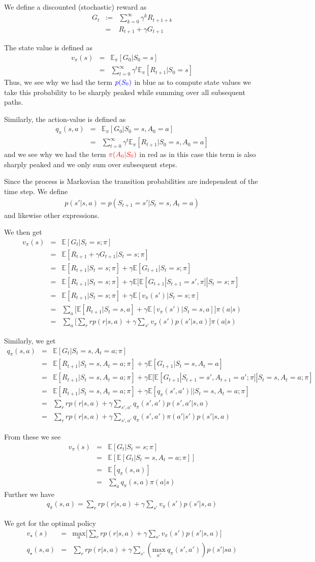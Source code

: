 \documentclass[11pt,a4paper]{article}
\newcommand\bea{\begin{eqnarray}}
\newcommand\eea{\end{eqnarray}}
\newcommand{\nn}{\nonumber \\}
\newcommand{\e}[1]{\mathbb E[#1]}
\begin{document}
We define a discounted (stochastic) reward as
\bea
G_t &:=& \sum_{k=0}^\infty \gamma^k R_{t+1+k} \nn
&=& R_{t+1} + \gamma G_{t+1}
\eea

The state value is defined as
\bea
v_\pi(s) &=& \mathbb E_\pi[G_0|S_0=s] \nn
&=& \sum_{t=0}^\infty \gamma^t \mathbb E_\pi[R_{t+1} |S_0=s]
\eea
Thus, we see why we had the term $\color{blue}{p(S_0)}$ in blue as to compute state values we take this probability to be sharply peaked while summing over all subsequent paths.

Similarly, the action-value is defined as 
\bea
q_\pi(s,a) &=& \mathbb E_\pi[G_0|S_0=s,A_0=a] \nn
&=& \sum_{t=0}^\infty \gamma^t \mathbb E_\pi[R_{t+1} |S_0=s,A_0=a]
\eea
and we see why we had the term $\color{red}{\pi(A_0|S_0)}$ in red as in this case this term is also sharply peaked and we only sum over subsequent steps. 

Since the process is Markovian the transition probabilities are independent of the time step. We define
\bea
p(s'|s,a) = p(S_{t+1}=s'|S_t=s,A_t=a)
\eea
and likewise other expressions.

We then get
\bea
v_\pi(s) &=& \e{G_t|S_t=s;\pi} \nn
&=& \e{R_{t+1} + \gamma G_{t+1} |S_t=s;\pi} \nn
&=& \e{R_{t+1}|S_t=s;\pi} + \gamma \e{G_{t+1}|S_t=s;\pi} \nn
&=& \e{R_{t+1}|S_t=s;\pi} + \gamma \e{\e{G_{t+1}|S_{t+1}=s',\pi}|S_t=s;\pi}  \nn
&=& \e{R_{t+1}|S_t=s;\pi} + \gamma \e{v_\pi(s') |S_t=s;\pi} \nn
&=& \sum_a \Bigg[\e{R_{t+1}|S_t=s,a} + \gamma \e{v_\pi(s') |S_t=s,a} \Bigg] \pi(a|s) \nn
&=& \sum_a \Bigg[\sum_r r p(r|s,a) + \gamma \sum_{s'} v_\pi(s') p(s'|s,a) \Bigg] \pi(a|s) 
\eea

Similarly, we get
\bea
q_\pi(s,a) &=& \e{G_t | S_t=s,A_t=a;\pi} \nn
&=& \e{R_{t+1} |S_t=s,A_t=a;\pi} + \gamma \e{G_{t+1} | S_t=s, A_t=a} \nn
&=& \e{R_{t+1} |S_t=s,A_t=a;\pi} + \gamma \e{ \e{G_{t+1} | S_{t+1}=s',A_{t+1}=a';\pi}|S_t=s, A_t=a;\pi} \nn
&=& \e{R_{t+1} |S_t=s,A_t=a;\pi} + \gamma \e{ q_\pi(s',a')||S_t=s, A_t=a;\pi} \nn
&=& \sum_r r p(r|s,a) + \gamma \sum_{s',a'} q_\pi(s',a') p(s',a'|s,a) \nn
&=&  \sum_r r p(r|s,a) + \gamma \sum_{s',a'} q_\pi(s',a') \pi(a'|s') p(s'|s,a)
\eea

From these we see
\bea
v_\pi(s) &=&  \e{G_t|S_t=s;\pi} \nn
&=& \e{\e{G_t|S_t=s,A_t=a;\pi} } \nn
&=& \e{q_\pi(s,a)} \nn
&=& \sum_a q_\pi(s,a) \pi(a|s)
\eea
Further we have
\bea
q_\pi(s,a) = \sum_r r p(r|s,a) + \gamma \sum_{s'} v_\pi(s') p(s'|s,a)
\eea


We get for the optimal policy
\bea
v_\star(s) &=&\underset{a}{\text{max}}  \Bigg[\sum_r r p(r|s,a) + \gamma \sum_{s'} v_\pi(s') p(s'|s,a) \Bigg]  \\
q_\star(s,a) &=& \sum_r r p(r|s,a)  + \gamma \sum_{s'} \left( \underset{a'}{\text{max}} ~q_\pi(s',a') \right)p(s'|sa)
\eea
\end{document}
